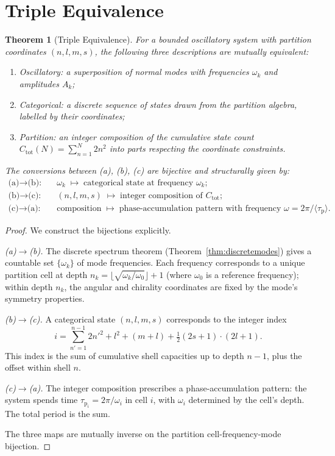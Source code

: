 \documentclass[twocolumn,11pt,a4paper]{article}
\theoremstyle{thmstyle}
\newtheorem{theorem}{Theorem}[section]
\theoremstyle{axiomstyle}
\theoremstyle{definition}
\theoremstyle{remark}
\newcommand{\Lag}{\tau_{\mathrm{p}}}
\begin{document}
\section{Triple Equivalence}
\label{sec:triple}

\begin{theorem}[Triple Equivalence]\label{thm:tripleeq}
For a bounded oscillatory system with partition coordinates $(n,l,m,s)$, the following three descriptions are mutually equivalent:
\begin{enumerate}[label=(\alph*),nosep]
\item \emph{Oscillatory:} a superposition of normal modes with frequencies $\omega_{k}$ and amplitudes $A_{k}$;
\item \emph{Categorical:} a discrete sequence of states drawn from the partition algebra, labelled by their coordinates;
\item \emph{Partition:} an integer composition of the cumulative state count $C_{\mathrm{tot}}(N)=\sum_{n=1}^{N}2n^{2}$ into parts respecting the coordinate constraints.
\end{enumerate}
The conversions between (a), (b), (c) are bijective and structurally given by:
\begin{align}
\text{(a)$\to$(b):} & \quad \omega_{k}\;\mapsto\;\text{categorical state at frequency $\omega_{k}$};\\
\text{(b)$\to$(c):} & \quad (n,l,m,s)\;\mapsto\;\text{integer composition of $C_{\mathrm{tot}}$};\\
\text{(c)$\to$(a):} & \quad \text{composition}\;\mapsto\;\text{phase-accumulation pattern with frequency $\omega=2\pi/\langle\Lag\rangle$}.
\end{align}
\end{theorem}

\begin{proof}
We construct the bijections explicitly.

\emph{(a)$\to$(b).} The discrete spectrum theorem (Theorem~\ref{thm:discretemodes}) gives a countable set $\{\omega_{k}\}$ of mode frequencies. Each frequency corresponds to a unique partition cell at depth $n_{k}=\lfloor\sqrt{\omega_{k}/\omega_{0}}\rfloor+1$ (where $\omega_{0}$ is a reference frequency); within depth $n_{k}$, the angular and chirality coordinates are fixed by the mode's symmetry properties.

\emph{(b)$\to$(c).} A categorical state $(n,l,m,s)$ corresponds to the integer index
\begin{equation}
i=\sum_{n'=1}^{n-1}2n'^{2}+l^{2}+(m+l)+\tfrac{1}{2}(2s+1)\cdot(2l+1).
\end{equation}
This index is the sum of cumulative shell capacities up to depth $n-1$, plus the offset within shell $n$.

\emph{(c)$\to$(a).} The integer composition prescribes a phase-accumulation pattern: the system spends time $\Lag_{i}=2\pi/\omega_{i}$ in cell $i$, with $\omega_{i}$ determined by the cell's depth. The total period is the sum.

The three maps are mutually inverse on the partition cell-frequency-mode bijection.
\end{proof}
\end{document}
